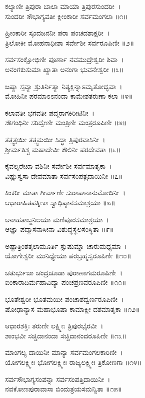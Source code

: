 
ಕಲ್ಯಾಣೀ ತ್ರಿಪುರಾ ಬಾಲಾ ಮಾಯಾ ತ್ರಿಪುರಸುಂದರೀ~।\\
ಸುಂದರೀ ಸೌಭಾಗ್ಯವತೀ ಕ್ಲೀಂಕಾರೀ ಸರ್ವಮಂಗಲಾ ॥೧॥

ಹ್ರೀಂಕಾರೀ ಸ್ಕಂದಜನನೀ ಪರಾ ಪಂಚದಶಾಕ್ಷರೀ~।\\
ತ್ರಿಲೋಕೀ ಮೋಹನಾಧೀಶಾ ಸರ್ವೇಶೀ ಸರ್ವರೂಪಿಣೀ ॥೨॥

ಸರ್ವಸಂಕ್ಷೋಭಿಣೀ ಪೂರ್ಣಾ ನವಮುದ್ರೇಶ್ವರೀ ಶಿವಾ~।\\
ಅನಂಗಕುಸುಮಾ ಖ್ಯಾತಾ ಅನಂಗಾ ಭುವನೇಶ್ವರೀ ॥೩॥

ಜಪ್ಯಾ ಸ್ತವ್ಯಾ ಶ್ರುತಿರ್ನಿತ್ಯಾ ನಿತ್ಯಕ್ಲಿನ್ನಾಽಮೃತೋದ್ಭವಾ~।\\
ಮೋಹಿನೀ ಪರಮಾಽಽನಂದಾ ಕಾಮೇಶತರುಣಾ ಕಲಾ ॥೪॥

ಕಲಾವತೀ ಭಗವತೀ ಪದ್ಮರಾಗಕಿರೀಟಿನೀ~।\\
ಸೌಗಂಧಿನೀ ಸರಿದ್ವೇಣೀ ಮಂತ್ರಿಣೀ ಮಂತ್ರರೂಪಿಣೀ ॥೫॥

ತತ್ತ್ವತ್ರಯೀ ತತ್ತ್ವಮಯೀ ಸಿದ್ಧಾ ತ್ರಿಪುರವಾಸಿನೀ~।\\
ಶ್ರೀರ್ಮತಿಶ್ಚ ಮಹಾದೇವೀ ಕೌಲಿನೀ ಪರದೇವತಾ ॥೬॥

ಕೈವಲ್ಯರೇಖಾ ವಶಿನೀ ಸರ್ವೇಶೀ ಸರ್ವಮಾತೃಕಾ~।\\
ವಿಷ್ಣುಸ್ವಸಾ ದೇವಮಾತಾ ಸರ್ವಸಂಪತ್ಪ್ರದಾಯಿನೀ ॥೭॥

ಕಿಂಕರೀ ಮಾತಾ ಗೀರ್ವಾಣೀ ಸುರಾಪಾನಾನುಮೋದಿನೀ~।\\
ಆಧಾರಾಹಿತಪತ್ನೀಕಾ ಸ್ವಾಧಿಷ್ಠಾನಸಮಾಶ್ರಯಾ ॥೮॥

ಅನಾಹತಾಬ್ಜನಿಲಯಾ ಮಣಿಪೂರಸಮಾಶ್ರಯಾ~।\\
ಆಜ್ಞಾ ಪದ್ಮಾಸನಾಸೀನಾ ವಿಶುದ್ಧಸ್ಥಲಸಂಸ್ಥಿತಾ ॥೯॥

ಅಷ್ಟಾತ್ರಿಂಶತ್ಕಲಾಮೂರ್ತಿ ಸ್ಸುಷುಮ್ನಾ ಚಾರುಮಧ್ಯಮಾ~।\\
ಯೋಗೇಶ್ವರೀ ಮುನಿಧ್ಯೇಯಾ ಪರಬ್ರಹ್ಮಸ್ವರೂಪಿಣೀ ॥೧೦॥

ಚತುರ್ಭುಜಾ ಚಂದ್ರಚೂಡಾ ಪುರಾಣಾಗಮರೂಪಿಣೀ~।\\
ಐಂಕಾರಾದಿರ್ಮಹಾವಿದ್ಯಾ ಪಂಚಪ್ರಣವರೂಪಿಣೀ ॥೧೧॥

ಭೂತೇಶ್ವರೀ ಭೂತಮಯೀ ಪಂಚಾಶದ್ವರ್ಣರೂಪಿಣೀ~।\\
ಷೋಢಾನ್ಯಾಸ ಮಹಾಭೂಷಾ ಕಾಮಾಕ್ಷೀ ದಶಮಾತೃಕಾ ॥೧೨॥

ಆಧಾರಶಕ್ತಿಃ ತರುಣೀ ಲಕ್ಷ್ಮೀಃ ತ್ರಿಪುರಭೈರವೀ~।\\
ಶಾಂಭವೀ ಸಚ್ಚಿದಾನಂದಾ ಸಚ್ಚಿದಾನಂದರೂಪಿಣೀ ॥೧೩॥

ಮಾಂಗಲ್ಯ ದಾಯಿನೀ ಮಾನ್ಯಾ ಸರ್ವಮಂಗಲಕಾರಿಣೀ~।\\
ಯೋಗಲಕ್ಷ್ಮೀಃ ಭೋಗಲಕ್ಷ್ಮೀಃ ರಾಜ್ಯಲಕ್ಷ್ಮೀಃ ತ್ರಿಕೋಣಗಾ ॥೧೪॥

ಸರ್ವಸೌಭಾಗ್ಯಸಂಪನ್ನಾ ಸರ್ವಸಂಪತ್ತಿದಾಯಿನೀ~।\\
ನವಕೋಣಪುರಾವಾಸಾ ಬಿಂದುತ್ರಯಸಮನ್ವಿತಾ ॥೧೫॥


